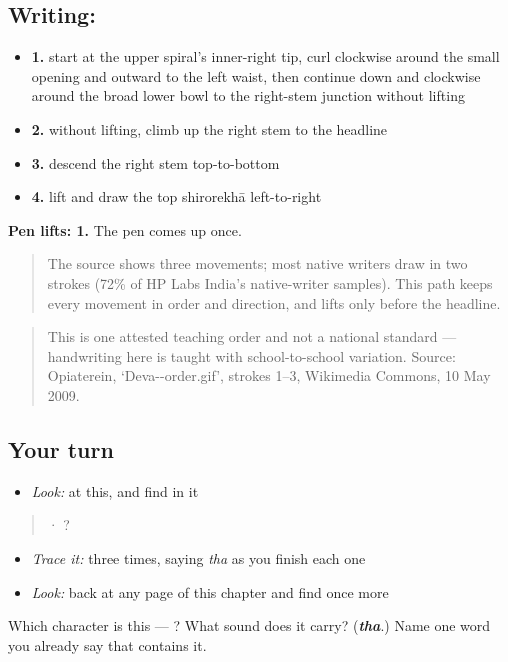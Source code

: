 \subsection*{Writing: }

\begin{itemize}
\raggedright
  \item \textbf{1.} start at the upper spiral's inner-right tip, curl clockwise around the small opening and outward to the left waist, then continue down and clockwise around the broad lower bowl to the right-stem junction without lifting
  \item \textbf{2.} without lifting, climb up the right stem to the headline
  \item \textbf{3.} descend the right stem top-to-bottom
  \item \textbf{4.} lift and draw the top shirorekhā left-to-right
\end{itemize}

\textbf{Pen lifts: 1.} The pen comes up once.

\begin{quote}
The source shows three movements; most native writers draw  in two strokes (72\% of HP Labs India's native-writer samples). This path keeps every movement in order and direction, and lifts only before the headline.
\end{quote}

\begin{quote}
This is one attested teaching order and not a national standard — handwriting here is taught with school-to-school variation. Source: Opiaterein, ‘Deva--order.gif’, strokes 1–3, Wikimedia Commons, 10 May 2009.
\end{quote}

\subsection*{Your turn}
\begin{itemize}
\raggedright
  \item \emph{Look:} at this, and find  in it
\end{itemize}

\begin{quote}
  ·    ?
\end{quote}

\begin{itemize}
\raggedright
  \item \emph{Trace it:}  three times, saying \emph{tha} as you finish each one
  \item \emph{Look:} back at any page of this chapter and find  once more
\end{itemize}

\begin{tcolorbox}[breakable,colback=teal!4,colframe=teal!35!black,title={Before you move on}]
Which character is this — ? What sound does it carry? (\emph{\textbf{tha}}.) Name one word you already say that contains it.
\end{tcolorbox}

